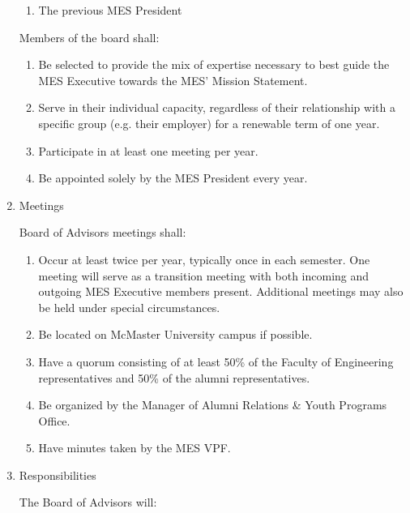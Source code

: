 \begin{enumerate}
  \begin{enumerate}
   \item
    The previous MES President
  \end{enumerate}

  Members of the board shall:

  \begin{enumerate}
   \item
    Be selected to provide the mix of expertise necessary to best guide
    the MES Executive towards the MES' Mission Statement.
   \item
    Serve in their individual capacity, regardless of their relationship
    with a specific group (e.g. their employer) for a renewable term of
    one year.
   \item
    Participate in at least one meeting per year.
   \item
    Be appointed solely by the MES President every year.
  \end{enumerate}


 \item
  Meetings

  Board of Advisors meetings shall:

  \begin{enumerate}
   \item
    Occur at least twice per year, typically once in each semester. One
    meeting will serve as a transition meeting with both incoming and
    outgoing MES Executive members present. Additional meetings may also
    be held under special circumstances.
   \item
    Be located on McMaster University campus if possible.
   \item
    Have a quorum consisting of at least 50\% of the Faculty of
    Engineering representatives and 50\% of the alumni representatives.
   \item
    Be organized by the Manager of Alumni Relations \& Youth Programs
    Office.
   \item
    Have minutes taken by the MES VPF.
  \end{enumerate}


 \item
  Responsibilities

  The Board of Advisors will:


\end{enumerate}
